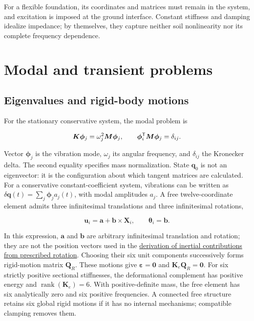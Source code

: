 For a flexible foundation, its coordinates and matrices must remain in the system, and excitation is imposed at the ground interface. Constant stiffness and damping idealize impedance; by themselves, they capture neither soil nonlinearity nor its complete frequency dependence.



\section{Modal and transient problems}
\subsection{Eigenvalues and rigid-body motions}
For the stationary conservative system, the modal problem is

\begin{equation}
\bm K\bm\phi_j=\omega_j^2\bm M\bm\phi_j,\qquad
\bm\phi_i^\mathsf T\bm M\bm\phi_j=\delta_{ij}.
\end{equation}

Vector $\bm\phi_j$ is the vibration mode, $\omega_j$ its angular frequency, and $\delta_{ij}$ the Kronecker delta. The second equality specifies mass normalization. State $\bm q_0$ is not an eigenvector: it is the configuration about which tangent matrices are calculated. For a conservative constant-coefficient system, vibrations can be written as $\delta\bm q(t)=\sum_j\bm\phi_j a_j(t)$, with modal amplitudes $a_j$.
A free twelve-coordinate element admits three infinitesimal translations and three infinitesimal rotations,

\begin{equation}
\bm u_i=\bm a+\bm b\times\bm X_i,\qquad \bm\theta_i=\bm b.
\label{eq:rigid}
\end{equation}

In this expression, $\bm a$ and $\bm b$ are arbitrary infinitesimal translation and rotation; they are not the position vectors used in the \hyperref[sec:giro]{derivation of inertial contributions from prescribed rotation}. Choosing their six unit components successively forms rigid-motion matrix $\bm Q_R$. These motions give $\bm\varepsilon=\bm0$ and $\bm K_e\bm Q_R=\bm0$. For six strictly positive sectional stiffnesses, the deformational complement has positive energy and $\operatorname{rank}(\bm K_e)=6$. With positive-definite mass, the free element has six analytically zero and six positive frequencies. A connected free structure retains six global rigid motions if it has no internal mechanisms; compatible clamping removes them.

